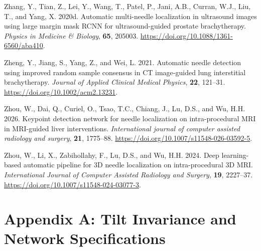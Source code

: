 \documentclass[
  11pt,
]{article}
\newlength{\cslhangindent}
\newenvironment{CSLReferences}[2] %
 {\begin{list}{}{%
  \setlength{\itemindent}{0pt}
  \setlength{\leftmargin}{0pt}
  \setlength{\parsep}{0pt}
  \ifodd #1
   \setlength{\leftmargin}{\cslhangindent}
   \setlength{\itemindent}{-1\cslhangindent}
  \fi
  \setlength{\itemsep}{#2\baselineskip}}}
 {\end{list}}
\begin{document}
\begin{CSLReferences}{1}{1}
Zhang, Y., Tian, Z., Lei, Y., Wang, T., Patel, P., Jani, A.B., Curran,
W.J., Liu, T., and Yang, X. 2020d. Automatic multi-needle localization
in ultrasound images using large margin mask {RCNN} for
ultrasound-guided prostate brachytherapy. \emph{Physics in Medicine \&
Biology}, \textbf{65}, 205003.
\url{https://doi.org/10.1088/1361-6560/aba410}.

Zheng, Y., Jiang, S., Yang, Z., and Wei, L. 2021. Automatic needle
detection using improved random sample consensus in {CT} image-guided
lung interstitial brachytherapy. \emph{Journal of Applied Clinical
Medical Physics}, \textbf{22}, 121--31.
\url{https://doi.org/10.1002/acm2.13231}.

Zhou, W., Dai, Q., Curiel, O., Tsao, T.C., Chiang, J., Lu, D.S., and Wu,
H.H. 2026. Keypoint detection network for needle localization on
intra-procedural MRI in MRI-guided liver interventions.
\emph{International journal of computer assisted radiology and surgery},
\textbf{21}, 1775--88. \url{https://doi.org/10.1007/s11548-026-03592-5}.

Zhou, W., Li, X., Zabihollahy, F., Lu, D.S., and Wu, H.H. 2024. Deep
learning-based automatic pipeline for {3D} needle localization on
intra-procedural {3D} {MRI}. \emph{International Journal of Computer
Assisted Radiology and Surgery}, \textbf{19}, 2227--37.
\url{https://doi.org/10.1007/s11548-024-03077-3}.

\end{CSLReferences}

\clearpage
\appendix

\section{Appendix A: Tilt Invariance and Network
Specifications}\label{appendix-a-tilt-invariance-and-network-specifications}
\end{document}
